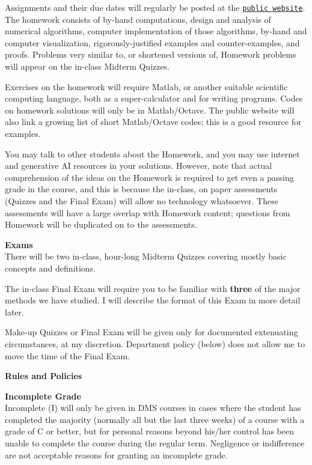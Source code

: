 \documentclass[12pt]{article}
\renewcommand{\emph}[1]{\textsf{\textbf{#1}}}
\newcommand{\localhead}[1]{\par\smallskip\textbf{#1} \smallskip\nobreak\\}%
\def\heading#1{\localhead{\large\emph{#1}}}
\def\subheading#1{\localhead{\emph{#1}}}
\begin{document}
Assignments and their due dates will regularly be posted at the \href{https://bueler.github.io/nla/}{\texttt{public website}}.  The homework consists of by-hand computations, design and analysis of numerical algorithms, computer implementation of those algorithms, by-hand and computer visualization, rigorously-justified examples and counter-examples, and proofs.  Problems very similar to, or shortened versions of, Homework problems will appear on the in-class Midterm Quizzes.

Exercises on the homework will require Matlab, or another suitable scientific computing language, both as a super-calculator and for writing programs.  Codes on homework solutions will only be in Matlab/Octave.  The public website will also link a growing list of short Matlab/Octave codes; this is a good resource for examples.

You may talk to other students about the Homework, and you may use internet and generative AI resources in your solutions.  However, note that actual comprehension of the ideas on the Homework is required to get even a passing grade in the course, and this is because the in-class, on paper assessments (Quizzes and the Final Exam) will allow no technology whatsoever.  These assessments will have a large overlap with Homework content; questions from Homework will be duplicated on to the assessments.

\heading{Exams}
There will be two in-class, hour-long Midterm Quizzes covering mostly basic concepts and definitions.

The in-class Final Exam will require you to be familiar with \textbf{three} of the major methods we have studied.  I will describe the format of this Exam in more detail later.

Make-up Quizzes or Final Exam will be given only for documented extenuating circumstances, at my discretion.  Department policy (below) does not allow me to move the time of the Final Exam.


\phantom{foo}

\heading{Rules and Policies}
\vskip -20pt

\subheading{Incomplete Grade} 
Incomplete (I) will only be given in
  DMS courses in cases where
  the student has completed the majority (normally all but the last
  three weeks) of a course with a grade of C or better, but for
  personal reasons beyond his/her control has been unable to complete
  the course during the regular term. Negligence or indifference are
  not acceptable reasons for granting an incomplete grade.
\end{document}
